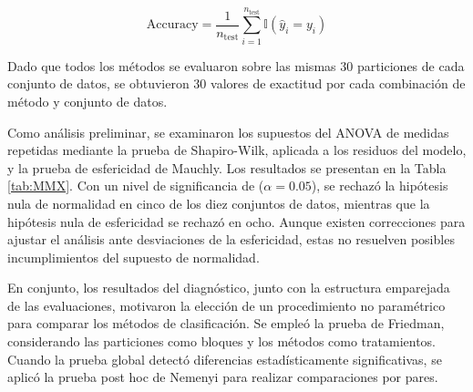 \begin{equation}
	\text{Accuracy} = \frac{1}{n_{\text{test}}} \sum_{i=1}^{n_{\text{test}}} \mathbb{I}(\hat{y}_i = y_i)
	\label{eq:EM22}
\end{equation}

Dado que todos los métodos se evaluaron sobre las mismas 30 particiones de cada conjunto de datos, se obtuvieron 30 valores de exactitud por cada combinación de método y conjunto de datos.

Como análisis preliminar, se examinaron los supuestos del ANOVA de medidas repetidas mediante la prueba de Shapiro-Wilk, aplicada a los residuos del modelo, y la prueba de esfericidad de Mauchly. Los resultados se presentan en la Tabla \ref{tab:MMX}. Con un nivel de significancia de ($\alpha=0.05$), se rechazó la hipótesis nula de normalidad en cinco de los diez conjuntos de datos, mientras que la hipótesis nula de esfericidad se rechazó en ocho. Aunque existen correcciones para ajustar el análisis ante desviaciones de la esfericidad, estas no resuelven posibles incumplimientos del supuesto de normalidad.

En conjunto, los resultados del diagnóstico, junto con la estructura emparejada de las evaluaciones, motivaron la elección de un procedimiento no paramétrico para comparar los métodos de clasificación. Se empleó la prueba de Friedman, considerando las particiones como bloques y los métodos como tratamientos. Cuando la prueba global detectó diferencias estadísticamente significativas, se aplicó la prueba post hoc de Nemenyi para realizar comparaciones por pares.

